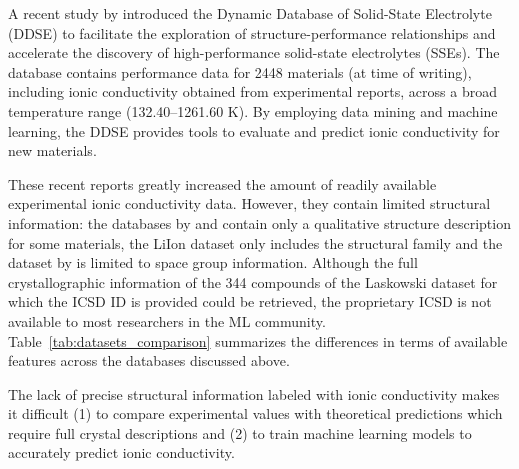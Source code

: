 A recent study by \citet{yang2024dynamic} introduced the Dynamic Database of Solid-State Electrolyte (DDSE) to facilitate the exploration of structure-performance relationships and accelerate the discovery of high-performance solid-state electrolytes (SSEs). The database contains performance data for 2448 materials (at time of writing), including ionic conductivity obtained from experimental reports, across a broad temperature range (132.40–1261.60 K). By employing data mining and machine learning, the DDSE provides tools to evaluate and predict ionic conductivity for new materials.

These recent reports greatly increased the amount of readily available experimental ionic conductivity data. However, they contain limited structural information: the databases by \citet{shon2023extracting} and \citet{yang2024dynamic} contain only a qualitative structure description for some materials, the LiIon dataset only includes the structural family and the dataset by \citet{laskowski2023identification} is limited to space group information. Although the full crystallographic information of the 344 compounds of the Laskowski dataset for which the ICSD ID is provided could be retrieved, the proprietary ICSD is not available to most researchers in the ML community. Table~\ref{tab:datasets_comparison} summarizes the differences in terms of available features across the databases discussed above. 

The lack of precise structural information labeled with ionic conductivity makes it difficult (1) to compare experimental values with theoretical predictions which require full crystal descriptions and (2) to train machine learning models to accurately predict ionic conductivity.


